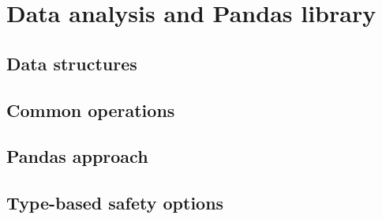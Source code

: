 \chapter{Data analysis and Pandas library}

\section{Data structures}

\section{Common operations}

\section{Pandas approach}

\section{Type-based safety options}

